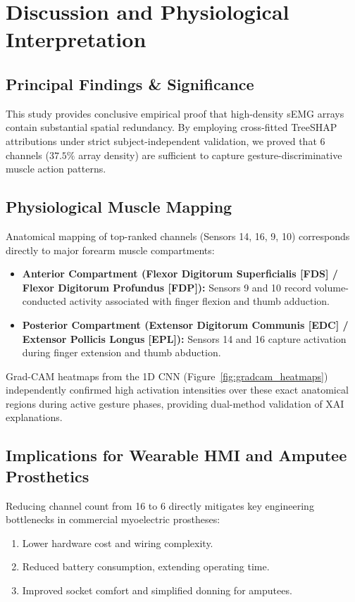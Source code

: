 \documentclass[final,5p,times,twocolumn]{elsarticle}
\begin{document}
\section{Discussion and Physiological Interpretation}

\subsection{Principal Findings & Significance}
This study provides conclusive empirical proof that high-density sEMG arrays contain substantial spatial redundancy. By employing cross-fitted TreeSHAP attributions under strict subject-independent validation, we proved that 6 channels ($37.5\%$ array density) are sufficient to capture gesture-discriminative muscle action patterns.

\subsection{Physiological Muscle Mapping}
Anatomical mapping of top-ranked channels (Sensors 14, 16, 9, 10) corresponds directly to major forearm muscle compartments:
\begin{itemize}
    \item \textbf{Anterior Compartment (Flexor Digitorum Superficialis [FDS] / Flexor Digitorum Profundus [FDP]):} Sensors 9 and 10 record volume-conducted activity associated with finger flexion and thumb adduction.
    \item \textbf{Posterior Compartment (Extensor Digitorum Communis [EDC] / Extensor Pollicis Longus [EPL]):} Sensors 14 and 16 capture activation during finger extension and thumb abduction.
\end{itemize}
Grad-CAM heatmaps from the 1D CNN (Figure~\ref{fig:gradcam_heatmaps}) independently confirmed high activation intensities over these exact anatomical regions during active gesture phases, providing dual-method validation of XAI explanations.

\subsection{Implications for Wearable HMI and Amputee Prosthetics}
Reducing channel count from 16 to 6 directly mitigates key engineering bottlenecks in commercial myoelectric prostheses:
\begin{enumerate}
    \item Lower hardware cost and wiring complexity.
    \item Reduced battery consumption, extending operating time.
    \item Improved socket comfort and simplified donning for amputees.
\end{enumerate}
\end{document}
